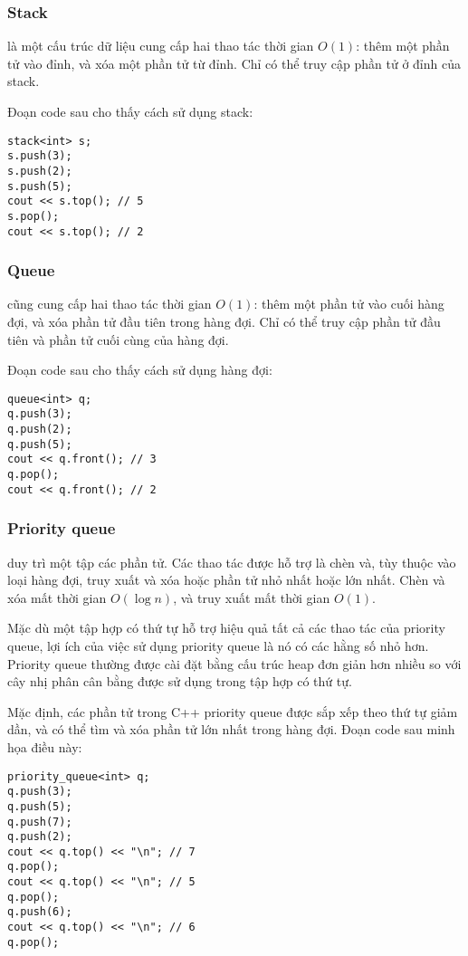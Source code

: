 \subsubsection{Stack}


là một cấu trúc dữ liệu cung cấp hai
thao tác thời gian $O(1)$:
thêm một phần tử vào đỉnh,
và xóa một phần tử từ đỉnh.
Chỉ có thể truy cập phần tử ở
đỉnh của stack.

Đoạn code sau cho thấy cách sử dụng stack:
\begin{lstlisting}
stack<int> s;
s.push(3);
s.push(2);
s.push(5);
cout << s.top(); // 5
s.pop();
cout << s.top(); // 2
\end{lstlisting}
\subsubsection{Queue}


 cũng
cung cấp hai thao tác thời gian $O(1)$:
thêm một phần tử vào cuối hàng đợi,
và xóa phần tử đầu tiên trong hàng đợi.
Chỉ có thể truy cập phần tử đầu tiên
và phần tử cuối cùng của hàng đợi.

Đoạn code sau cho thấy cách sử dụng hàng đợi:
\begin{lstlisting}
queue<int> q;
q.push(3);
q.push(2);
q.push(5);
cout << q.front(); // 3
q.pop();
cout << q.front(); // 2
\end{lstlisting}

\subsubsection{Priority queue}


duy trì một tập các phần tử.
Các thao tác được hỗ trợ là chèn và,
tùy thuộc vào loại hàng đợi,
truy xuất và xóa
hoặc phần tử nhỏ nhất hoặc lớn nhất.
Chèn và xóa mất thời gian $O(\log n)$,
và truy xuất mất thời gian $O(1)$.

Mặc dù một tập hợp có thứ tự hỗ trợ hiệu quả
tất cả các thao tác của priority queue,
lợi ích của việc sử dụng priority queue là
nó có các hằng số nhỏ hơn.
Priority queue thường được cài đặt bằng
cấu trúc heap đơn giản hơn nhiều so với
cây nhị phân cân bằng được sử dụng trong tập hợp có thứ tự.

\begin{samepage}
Mặc định, các phần tử trong C++
priority queue được sắp xếp theo thứ tự giảm dần,
và có thể tìm và xóa
phần tử lớn nhất trong hàng đợi.
Đoạn code sau minh họa điều này:

\begin{lstlisting}
priority_queue<int> q;
q.push(3);
q.push(5);
q.push(7);
q.push(2);
cout << q.top() << "\n"; // 7
q.pop();
cout << q.top() << "\n"; // 5
q.pop();
q.push(6);
cout << q.top() << "\n"; // 6
q.pop();
\end{lstlisting}
\end{samepage}

